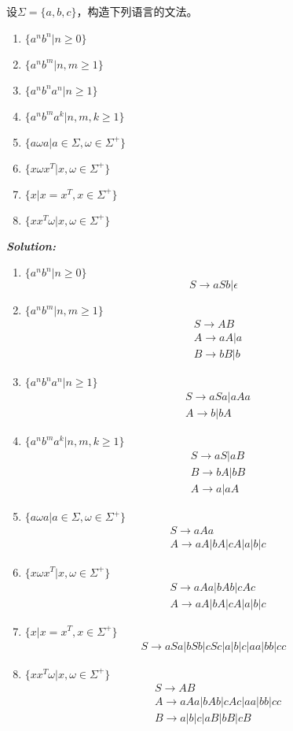 \documentclass[a4paper]{ctexart}
\begin{document}
 设$\Sigma=\{a,b,c\}$，构造下列语言的文法。
\begin{enumerate}[(1)]
\item $\{a^nb^n |n\geq 0\}$
\item $\{a^nb^m|n,m\geq 1\}$
\item $\{a^nb^na^n|n\geq 1\}$
\item $\{a^nb^ma^k | n,m,k\geq 1\}$
\item $\{a\omega a |a\in \Sigma,\omega \in \Sigma^+\}$
\item $\{x\omega x^T|x,\omega\in \Sigma^+\}$
\item $\{x|x=x^T,x\in \Sigma^+\}$
\item $\{xx^T\omega |x,\omega \in\Sigma^+\}$
\end{enumerate}
\textbf{\emph{Solution:}}
\begin{enumerate}[(1)]
\item $\{a^nb^n |n\geq 0\}$
\[
S\to aSb|\epsilon
\]   
\item $\{a^nb^m|n,m\geq 1\}$
\[
\begin{split}
&S\to AB\\
&A\to aA|a\\
&B\to bB|b
\end{split}
\]
\item $\{a^nb^na^n|n\geq 1\}$
\[
\begin{split}
&S\to aSa|aAa\\
&A\to b|bA
\end{split}
\]
\item $\{a^nb^ma^k | n,m,k\geq 1\}$
\[
\begin{split}
&S\to aS|aB\\
&B\to bA|bB\\
&A\to a|aA
\end{split}
\]
\item $\{a\omega a |a\in \Sigma,\omega \in \Sigma^+\}$
\[
\begin{split}
&S\to aAa\\
&A\to aA|bA|cA|a|b|c
\end{split}
\]
\item $\{x\omega x^T|x,\omega\in \Sigma^+\}$
\[
\begin{split}
&S\to aAa|bAb|cAc\\
&A\to aA|bA|cA|a|b|c
\end{split}
\]
\item $\{x|x=x^T,x\in \Sigma^+\}$
\[
\begin{split}
S\to aSa|bSb|cSc|a|b|c|aa|bb|cc
\end{split}
\]
\item $\{xx^T\omega |x,\omega \in\Sigma^+\}$
\[
\begin{split}
&S\to AB\\
&A\to aAa|bAb|cAc|aa|bb|cc\\
&B\to a|b|c|aB|bB|cB
\end{split}
\]
\end{enumerate}
\end{document}
